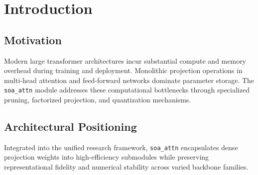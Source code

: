 \section{Introduction}

\subsection{Motivation}
Modern large transformer architectures incur substantial compute and memory overhead during training and deployment. Monolithic projection operations in multi-head attention and feed-forward networks dominate parameter storage. The \texttt{soa_attn} module addresses these computational bottlenecks through specialized pruning, factorized projection, and quantization mechanisms.

\subsection{Architectural Positioning}
Integrated into the unified research framework, \texttt{soa_attn} encapsulates dense projection weights into high-efficiency submodules while preserving representational fidelity and numerical stability across varied backbone families.
